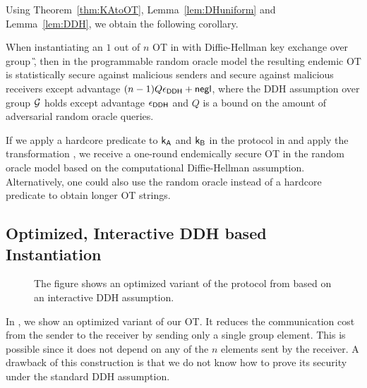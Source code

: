 Using Theorem~\ref{thm:KAtoOT}, Lemma~\ref{lem:DHuniform} and Lemma~\ref{lem:DDH}, we obtain the following corollary.

\begin{corollary}
When instantiating an $1$ out of $n$ OT in  with Diffie-Hellman key exchange over group \G, then in the programmable random oracle model the resulting endemic OT is statistically secure against malicious senders and secure against malicious receivers except advantage $(n-1)Q\epsilon_{\mathsf{DDH}}+\mathsf{negl}$, where the DDH assumption over group $\mathcal{G}$ holds except advantage $\epsilon_{\mathsf{DDH}}$ and $Q$ is a bound on the amount of adversarial random oracle queries.
\end{corollary}

\begin{remark}
If we apply a hardcore predicate to $\mathsf{k}_{\mathsf{A}}$ and $\mathsf{k}_{\mathsf{B}}$ in the protocol in  and apply the transformation , we receive a one-round endemically secure OT in the random oracle model based on the computational Diffie-Hellman assumption. Alternatively, one could also use the random oracle instead of a hardcore predicate to obtain longer OT strings. 
\end{remark}

\subsection{Optimized, Interactive DDH based Instantiation}\label{sec:optOT}
\begin{figure}
\centering
{}
\myvspace{-0.3cm}
\caption{The figure shows an optimized variant of the protocol from  based on an interactive DDH assumption.}
\label{fig:optKAtoOT}
\end{figure}
In , we show an optimized variant of our OT. It reduces the communication cost from the sender to the receiver by sending only a single group element. This is possible since it does not depend on any of the $n$ elements sent by the receiver. A drawback of this construction is that we do not know how to prove its security under the standard DDH assumption.


